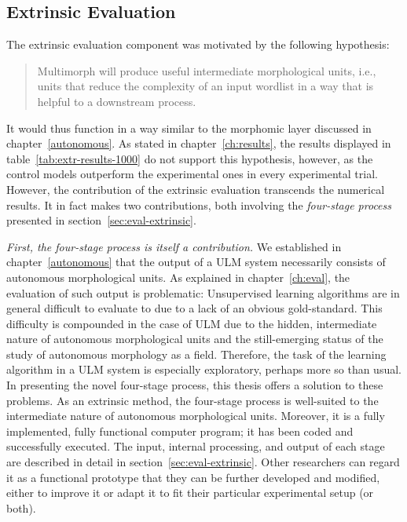 \subsection{Extrinsic Evaluation}
The extrinsic evaluation component was motivated by the following hypothesis:
\begin{quotation}\noindent
Multimorph will produce useful intermediate morphological units, i.e., units that reduce the
complexity of an input wordlist in a way that is helpful to a downstream process.
\end{quotation}
 It would thus function in a way similar to the morphomic layer discussed in chapter~\ref{autonomous}. As stated in chapter~\ref{ch:results}, the results displayed in table~\ref{tab:extr-results-1000} do not support this hypothesis, however, as the control models outperform the experimental ones in every experimental trial. 
However, the contribution of the extrinsic evaluation transcends the numerical results.
It in fact makes two contributions, both involving the \emph{four-stage process} presented in section~\ref{sec:eval-extrinsic}.

\emph{First, the four-stage process is itself a contribution.}
We established in chapter~\ref{autonomous} that the output of a 
ULM system necessarily consists of autonomous morphological units.
As explained in chapter~\ref{ch:eval}, the evaluation of such output is problematic: Unsupervised learning algorithms are in general difficult to evaluate to due to a lack of an obvious gold-standard. This difficulty is compounded in the case of ULM due to the hidden, intermediate nature of autonomous morphological units and the still-emerging status of the study of autonomous morphology as a field.  Therefore, the task of the learning algorithm in a ULM system is especially exploratory, perhaps more so than usual. %
In presenting the novel four-stage process, this thesis offers a solution 
to these problems. As an extrinsic method, the four-stage process is well-suited to the intermediate nature of autonomous morphological units. 
Moreover, it is a fully implemented, fully functional computer program; 
it has been coded and successfully executed. The input, internal 
processing, and output of each stage are described in detail in 
section~\ref{sec:eval-extrinsic}. Other researchers can regard 
it as a functional prototype that they can be further developed and 
modified, either to improve it or adapt it to fit their particular experimental setup (or both).


